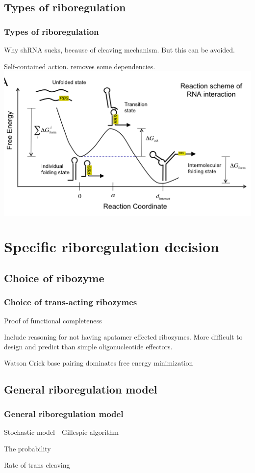 \documentclass{beamer}
\begin{document}
\subsection{Types of riboregulation}
\begin{frame}
\frametitle{Types of riboregulation}

Why shRNA sucks, because of cleaving mechanism. But this can
be avoided.

Self-contained action. removes some dependencies.
\includegraphics[scale=1]{energy_riboregulation.png}

\end{frame}

\section{Specific riboregulation decision}
\subsection{Choice of ribozyme}

\begin{frame}
\frametitle{Choice of trans-acting ribozymes}
Proof of functional completeness

Include reasoning for not having apatamer effected
ribozymes. More difficult to design and predict than
simple oligonucleotide effectors. 

Watson Crick base pairing dominates free energy minimization
\end{frame}


\subsection{General riboregulation model}
\begin{frame}
\frametitle{General riboregulation model}
Stochastic model - Gillespie algorithm

The probability 

Rate of trans cleaving
\end{frame}
\end{document}
